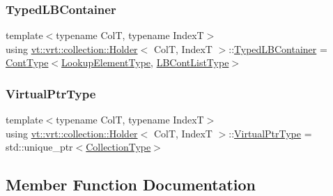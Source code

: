 \subsubsection{\texorpdfstring{Typed\+L\+B\+Container}{TypedLBContainer}}
{\footnotesize\ttfamily template$<$typename ColT, typename IndexT$>$ \\
using \hyperlink{structvt_1_1vrt_1_1collection_1_1_holder}{vt\+::vrt\+::collection\+::\+Holder}$<$ ColT, IndexT $>$\+::\hyperlink{structvt_1_1vrt_1_1collection_1_1_holder_a9738cadcf89ace9c3d0c23990e4f919e}{Typed\+L\+B\+Container} =  \hyperlink{structvt_1_1vrt_1_1collection_1_1_holder_ae3bb115b69cf47e14a4e8441cebe9142}{Cont\+Type}$<$\hyperlink{structvt_1_1vrt_1_1collection_1_1_holder_a3206c3e5eb5d6deb4667409222163b77}{Lookup\+Element\+Type}, \hyperlink{structvt_1_1vrt_1_1collection_1_1_holder_af26a59243dd4e1a86d8fcf320a8dc463}{L\+B\+Cont\+List\+Type}$>$}

\mbox{\label{structvt_1_1vrt_1_1collection_1_1_holder_a04ba57a7b2c48ce6b4c90d3f3b33f43c}} 
\subsubsection{\texorpdfstring{Virtual\+Ptr\+Type}{VirtualPtrType}}
{\footnotesize\ttfamily template$<$typename ColT, typename IndexT$>$ \\
using \hyperlink{structvt_1_1vrt_1_1collection_1_1_holder}{vt\+::vrt\+::collection\+::\+Holder}$<$ ColT, IndexT $>$\+::\hyperlink{structvt_1_1vrt_1_1collection_1_1_holder_a04ba57a7b2c48ce6b4c90d3f3b33f43c}{Virtual\+Ptr\+Type} =  std\+::unique\+\_\+ptr$<$\hyperlink{structvt_1_1vrt_1_1collection_1_1_holder_a38b4a4bfc4408cf28918c32433c80aac}{Collection\+Type}$>$}



\subsection{Member Function Documentation}
\mbox{\label{structvt_1_1vrt_1_1collection_1_1_holder_a9f0e6df0202f45cdfb8b190fbce86141}} 
